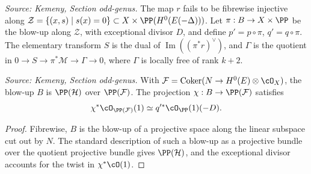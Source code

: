 \begin{definition}
  \label{def:kemeny_odd_blowup_elementary_transform}
  \textit{Source: Kemeny, Section odd-genus.}
  The map \(r\) fails to be fibrewise injective along
  \(\mathcal Z=\{(x,s)\mid s(x)=0\}\subset X\times\PP(H^0(E(-\Delta)))\).  Let
  \(\pi:B\to X\times\PP\) be the blow-up along \(\mathcal Z\), with exceptional
  divisor \(D\), and define \(p'=p\circ\pi\), \(q'=q\circ\pi\).  The elementary
  transform \(S\) is the dual of \(\operatorname{Im}((\pi^*r)^\vee)\), and
  \(\Gamma\) is the quotient in \(0\to S\to\pi^*\mathcal M\to\Gamma\to0\), where
  \(\Gamma\) is locally free of rank \(k+2\).
\end{definition}

\begin{lemma}
  \label{lem:kemeny_odd_projective_bundle_model}
  \textit{Source: Kemeny, Section odd-genus.}
  With \(\mathcal F=\operatorname{Coker}(N\to H^0(E)\otimes\cO_X)\), the blow-up
  \(B\) is \(\PP(\mathcal H)\) over \(\PP(\mathcal F)\).  The projection
  \(\chi:B\to\PP(\mathcal F)\) satisfies
  \[
    \chi^*\cO_{\PP(\mathcal F)}(1)\simeq q'^*\cO_{\PP}(1)(-D).
  \]
\end{lemma}
\begin{proof}
  Fibrewise, \(B\) is the blow-up of a projective space along the linear subspace
  cut out by \(N\).  The standard description of such a blow-up as a projective
  bundle over the quotient projective bundle gives \(\PP(\mathcal H)\), and the
  exceptional divisor accounts for the twist in \(\chi^*\cO(1)\).
\end{proof}

